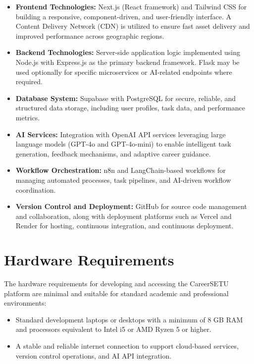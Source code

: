 \documentclass[12pt,a4paper]{report}
\begin{document}
\begin{itemize}
    \item \textbf{Frontend Technologies:} Next.js (React framework) and Tailwind CSS
    for building a responsive, component-driven, and user-friendly interface.
    A Content Delivery Network (CDN) is utilized to ensure fast asset delivery and
    improved performance across geographic regions.
    
    \item \textbf{Backend Technologies:} Server-side application logic implemented
    using Node.js with Express.js as the primary backend framework. Flask may be used
    optionally for specific microservices or AI-related endpoints where required.
    
    \item \textbf{Database System:} Supabase with PostgreSQL for secure, reliable, and
    structured data storage, including user profiles, task data, and performance metrics.
    
    \item \textbf{AI Services:} Integration with OpenAI API services leveraging
    large language models (GPT-4o and GPT-4o-mini) to enable intelligent task
    generation, feedback mechanisms, and adaptive career guidance.
    
    \item \textbf{Workflow Orchestration:} n8n and LangChain-based workflows for managing
    automated processes, task pipelines, and AI-driven workflow coordination.
    
    \item \textbf{Version Control and Deployment:} GitHub for source code management
    and collaboration, along with deployment platforms such as Vercel and Render
    for hosting, continuous integration, and continuous deployment.
\end{itemize}

\section{Hardware Requirements}

The hardware requirements for developing and accessing the CareerSETU platform are
minimal and suitable for standard academic and professional environments:

\begin{itemize}
    \item Standard development laptops or desktops with a minimum of 8 GB RAM and
    processors equivalent to Intel i5 or AMD Ryzen 5 or higher.
    
    \item A stable and reliable internet connection to support cloud-based services,
    version control operations, and AI API integration.
\end{itemize}
\end{document}
